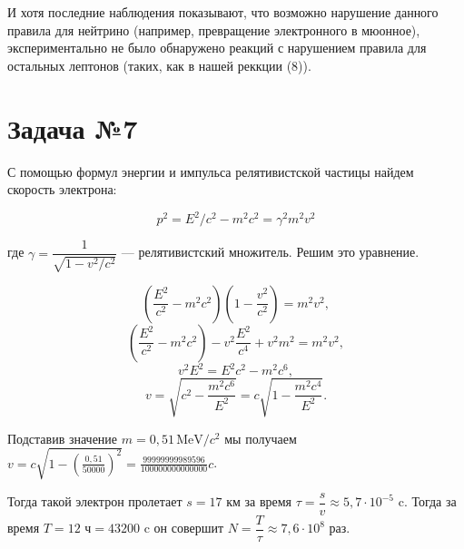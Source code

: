 \documentclass[12pt]{urticle}
\newcommand{\x}{\cdot}
\begin{document}
 И хотя последние наблюдения показывают, что возможно нарушение данного правила для нейтрино (например, превращение электронного в мюонное), экспериментально не было обнаружено реакций с нарушением правила для остальных лептонов (таких, как в нашей реккции (8)). 

\section{Задача №7}

С помощью формул энергии и импульса релятивистской частицы найдем скорость электрона: 

\begin{equation}
p^2 = E^2/c^2 - m^2c^2 = \gamma^2 m^2v^2 
\end{equation}

где $ \gamma = \dfrac{1}{\sqrt{1-v^2/c^2}} $ --- релятивистский множитель. Решим это уравнение. %

$$ \left( \dfrac{E^2}{c^2} - m^2c^2\right) \left(1 - \dfrac{v^2}{c^2}\right) = m^2v^2 ,$$
$$ \left( \dfrac{E^2}{c^2} - m^2c^2\right) - v^2\dfrac{E^2}{c^4} + v^2m^2   = m^2v^2,$$
$$  v^2 E^2 = E^2c^2 - m^2c^6   ,$$
\begin{equation}v = \sqrt{c^2 - \dfrac{m^2c^6}{E^2}} = c\sqrt{1 - \dfrac{m^2c^4}{E^2}} .
\end{equation}

Подставив значение $ m = 0,51 \, \text{MeV}/c^2 $ мы получаем  $ v = c\sqrt{1 - (\frac{0,51}{50000})^2} = \frac{99999999989596}{100000000000000}c$.

Тогда такой электрон пролетает $ s = 17 $ км за время $ \tau  = \dfrac{s}{v}  \approx 5,7 \x 10^{-5} $ c. Тогда за время $ T = 12 \text{ ч} = 43200 \text{ c} $ он совершит $ N = \dfrac{T}{\tau} \approx 7,6 \x 10^8 $ раз.

\begin{center}
	{\fbox{Ответ: $ N \approx 7,6 \x 10^8 $ раз}} \\
\end{center} 
\end{document}
